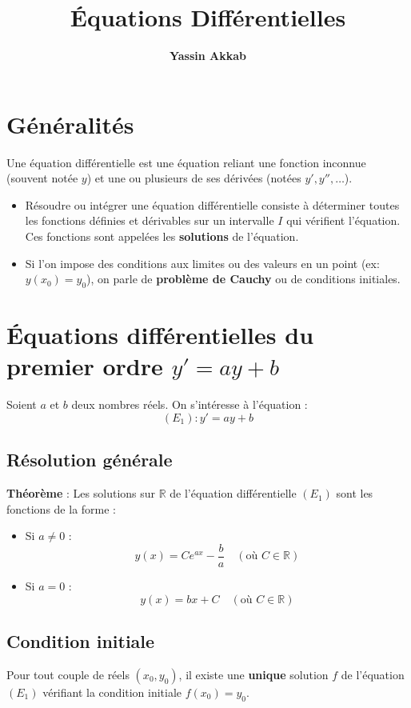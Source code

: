 \documentclass{article}
\title{\textbf{Équations Différentielles}}
\author{\textbf{Yassin Akkab}}
\begin{document}
	
	\maketitle
	\tableofcontents
	\newpage
	
	\section{Généralités}
	Une équation différentielle est une équation reliant une fonction inconnue (souvent notée $y$) et une ou plusieurs de ses dérivées (notées $y', y'', \dots$).
	\begin{itemize}
		\item Résoudre ou intégrer une équation différentielle consiste à déterminer toutes les fonctions définies et dérivables sur un intervalle $I$ qui vérifient l'équation. Ces fonctions sont appelées les \textbf{solutions} de l'équation.
		\item Si l'on impose des conditions aux limites ou des valeurs en un point (ex: $y(x_0) = y_0$), on parle de \textbf{problème de Cauchy} ou de conditions initiales.
	\end{itemize}
	
	\section{Équations différentielles du premier ordre $y' = ay + b$}
	Soient $a$ et $b$ deux nombres réels. On s'intéresse à l'équation :
	\[ (E_1) : y' = ay + b \]
	
	\subsection{Résolution générale}
	\textbf{Théorème} : Les solutions sur $\mathbb{R}$ de l'équation différentielle $(E_1)$ sont les fonctions de la forme :
	\begin{itemize}
		\item Si $a \ne 0$ :
		\[ y(x) = C e^{ax} - \frac{b}{a} \quad (\text{où } C \in \mathbb{R}) \]
		\item Si $a = 0$ :
		\[ y(x) = bx + C \quad (\text{où } C \in \mathbb{R}) \]
	\end{itemize}
	
	\subsection{Condition initiale}
	Pour tout couple de réels $(x_0, y_0)$, il existe une \textbf{unique} solution $f$ de l'équation $(E_1)$ vérifiant la condition initiale $f(x_0) = y_0$.
	
\end{document}
